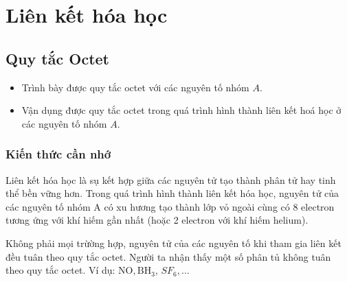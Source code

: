 \chapter{Liên kết hóa học}
\section{Quy tắc Octet}
\begin{mtbh}
	\begin{itemize}
		\item Trình bày được quy tắc octet với các nguyên tố nhóm $A$.
		\item Vận dụng được quy tắc octet trong quá trình hình thành liên kết hoá học ở các nguyên tố nhóm $A$.
	\end{itemize}
\end{mtbh}
\subsection{Kiến thức cần nhớ}
\begin{hoplythuyet}
	Liên kết hóa học là sụ kết hợp giữa các nguyên tử tạo thành phân tử hay tinh thể bền vững hơn.
	Trong quá trình hình thành liên kết hóa học, nguyên tử của các nguyên tố nhóm A có xu hương tạo thành lớp vỏ ngoài cùng có 8 electron tương ứng với khí hiếm gần nhất (hoặc 2 electron với khí hiếm helium).
\end{hoplythuyet}
\begin{notegsnd}
	Không phải mọi trừờng hợp, nguyên tử của các nguyên tố khi tham gia liên kết đều tuân theo quy tắc octet. Người ta nhận thấy một số phân tủ không tuân theo quy tắc octet. Ví dụ: $\mathrm{NO}, \mathrm{BH}_3$, $S F_6, \ldots$
\end{notegsnd}

